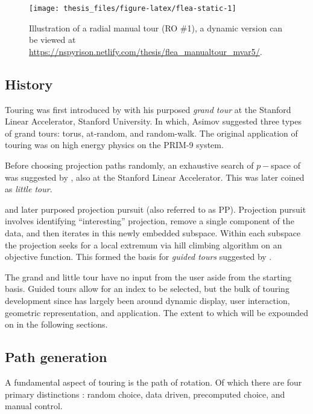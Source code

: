 \documentclass{monashthesis}
\begin{document}
\begin{figure}

{\centering \texttt{[image: thesis\_files/figure-latex/flea-static-1]} 

}

\caption{Illustration of a radial manual tour (RO \#1), a
dynamic version can be viewed at
\url{https://nspyrison.netlify.com/thesis/flea_manualtour_mvar5/}.}\label{fig:flea-static}
\end{figure}

\subsection{History}\label{history}

Touring was first introduced by \textcite{asimov_grand_1985} with his
purposed \emph{grand tour} at the Stanford Linear Accelerator, Stanford
University. In which, Asimov suggested three types of grand tours:
torus, at-random, and random-walk. The original application of touring
was on high energy physics on the PRIM-9 system.

Before choosing projection paths randomly, an exhaustive search of
\(p-\)space of was suggested by \textcite{mcdonald_interactive_1982},
also at the Stanford Linear Accelerator. This was later coined as
\emph{little tour}.

\textcite{friedman_projection_1974} and later
\textcite{huber_projection_1985} purposed projection pursuit (also
referred to as PP). Projection pursuit involves identifying
``interesting'' projection, remove a single component of the data, and
then iterates in this newly embedded subspace. Within each subspace the
projection seeks for a local extremum via hill climbing algorithm on an
objective function. This formed the basis for \emph{guided tours}
suggested by \textcite{hurley_analyzing_1990}.

The grand and little tour have no input from the user aside from the
starting basis. Guided tours allow for an index to be selected, but the
bulk of touring development since has largely been around dynamic
display, user interaction, geometric representation, and application.
The extent to which will be expounded on in the following sections.

\subsection{Path generation}\label{path-generation}

A fundamental aspect of touring is the path of rotation. Of which there
are four primary distinctions \autocite{buja_computational_2005}: random
choice, data driven, precomputed choice, and manual control.
\end{document}
